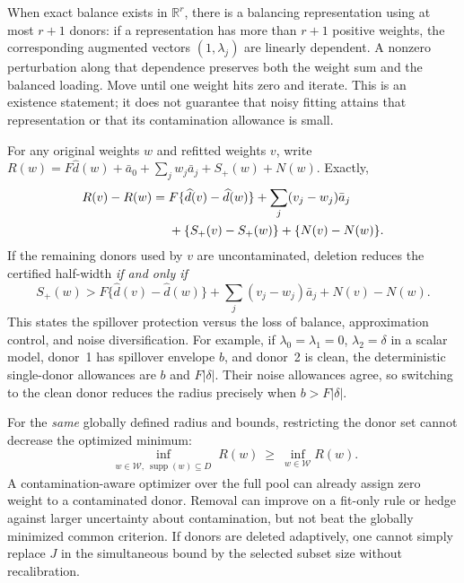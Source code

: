 \documentclass[11pt,a4paper]{article}
\newcommand{\R}{\mathbb R}
\newcommand{\W}{\mathcal W}
\DeclareMathOperator{\supp}{supp}
\begin{document}
When exact balance exists in $\R^r$, there is a balancing representation using at most $r+1$ donors: if a representation has more than $r+1$ positive weights, the corresponding augmented vectors $(1,\lambda_j)$ are linearly dependent. A nonzero perturbation along that dependence preserves both the weight sum and the balanced loading. Move until one weight hits zero and iterate. This is an existence statement; it does not guarantee that noisy fitting attains that representation or that its contamination allowance is small.

For any original weights $w$ and refitted weights $v$, write
$R(w)=F\widehat d(w)+\bar a_0+\sum_jw_j\bar a_j+S_+(w)+N(w)$. Exactly,
\begin{align}\label{eq:deletion}
 R(v)-R(w)={}&F\{\widehat d(v)-\widehat d(w)\}
 +\sum_j(v_j-w_j)\bar a_j\notag\\
 &+\{S_+(v)-S_+(w)\}+\{N(v)-N(w)\}.
\end{align}
If the remaining donors used by $v$ are uncontaminated, deletion reduces the certified half-width \emph{if and only if}
\begin{equation}\label{eq:delete-condition}
 S_+(w)>F\{\widehat d(v)-\widehat d(w)\}
 +\sum_j(v_j-w_j)\bar a_j+N(v)-N(w).
\end{equation}
This states the spillover protection versus the loss of balance, approximation control, and noise diversification. For example, if $\lambda_0=\lambda_1=0$, $\lambda_2=\delta$ in a scalar model, donor~1 has spillover envelope $b$, and donor~2 is clean, the deterministic single-donor allowances are $b$ and $F|\delta|$. Their noise allowances agree, so switching to the clean donor reduces the radius precisely when $b>F|\delta|$.

For the \emph{same} globally defined radius and bounds, restricting the donor set cannot decrease the optimized minimum:
\[
 \inf_{\substack{w\in\W,\ \supp(w)\subseteq D}}R(w)
 \ \ge\ \inf_{w\in\W}R(w).
\]
A contamination-aware optimizer over the full pool can already assign zero weight to a contaminated donor. Removal can improve on a fit-only rule or hedge against larger uncertainty about contamination, but not beat the globally minimized common criterion. If donors are deleted adaptively, one cannot simply replace $J$ in the simultaneous bound by the selected subset size without recalibration.
\end{document}
